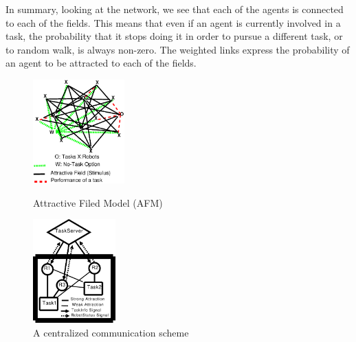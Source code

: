 \documentclass{llncs}
\begin{document}
In summary, looking at the network, we see that each of the agents is connected to each of the fields. This means that even if an agent is currently involved in a task, the probability that it stops doing it in order to pursue a different task, or to random walk, is always non-zero.  The weighted links express the probability of an agent to be attracted to each of the fields.
\begin{figure}
\begin{minipage}[t]{0.48\linewidth}
\centering
\includegraphics[height=4cm, angle=0]{./images/AFM-Diag2.eps}
\caption{\small Attractive Filed Model (AFM)}
\label{fig:afm} %
\end{minipage}
\hspace{0.5cm}
\begin{minipage}[t]{0.48\linewidth}
\centering
\includegraphics[height=4cm, angle=0]{./images/CentralizedComm.eps}
\caption{\small A centralized communication scheme} %
\label{fig:ccm} %
\end{minipage}
\end{figure}
\end{document}
